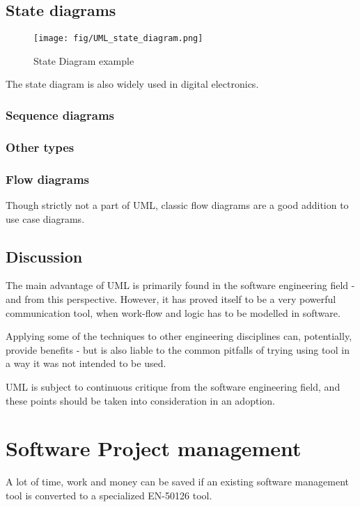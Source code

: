 \documentclass[10pt,a4paper]{article}
\begin{document}
\subsection{State diagrams}
\begin{figure}[h]
\centering
\texttt{[image: fig/UML\_state\_diagram.png]} 
\caption{State Diagram example}
\label{fig:state_diagram_example}
\end{figure}

The state diagram is also widely used in digital electronics.


\subsubsection{Sequence diagrams}

\subsubsection{Other types}


\subsubsection*{Flow diagrams}
Though strictly not a part of UML, classic flow diagrams are a good addition to use case diagrams.


\subsection{Discussion}
The main advantage of UML is primarily found in the software engineering field - and from this perspective. However, it has proved itself to be a very powerful communication tool, when work-flow and logic has to be modelled in software.

Applying some of the techniques to other engineering disciplines can, potentially, provide benefits - but is also liable to the common pitfalls of trying using tool in a way it was not intended to be used.

UML is subject to continuous critique from the software engineering field, and these points should be taken into consideration in an adoption.

\section{Software Project management}
A lot of time, work and money can be saved if an existing software management tool is converted to a specialized EN-50126 tool.
\end{document}
